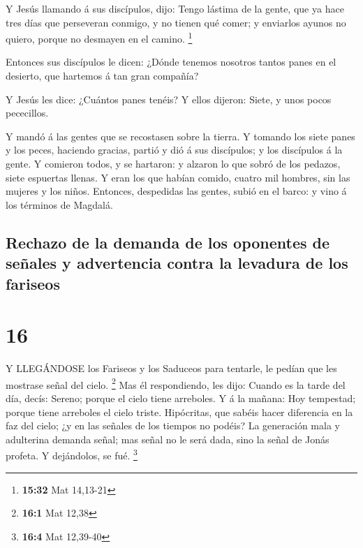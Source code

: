  Y Jesús llamando á sus discípulos, dijo: Tengo lástima de
la gente, que ya hace tres días que perseveran conmigo, y no tienen qué
comer; y enviarlos ayunos no quiero, porque no desmayen en el camino.
\footnote{\textbf{15:32} Mat 14,13-21}

 Entonces sus discípulos le dicen: ¿Dónde tenemos nosotros
tantos panes en el desierto, que hartemos á tan gran compañía?

 Y Jesús les dice: ¿Cuántos panes tenéis? Y ellos dijeron:
Siete, y unos pocos pececillos.

 Y mandó á las gentes que se recostasen sobre la tierra.
 Y tomando los siete panes y los peces, haciendo gracias,
partió y dió á sus discípulos; y los discípulos á la gente.
 Y comieron todos, y se hartaron: y alzaron lo que sobró de
los pedazos, siete espuertas llenas.  Y eran los que habían
comido, cuatro mil hombres, sin las mujeres y los niños. 
Entonces, despedidas las gentes, subió en el barco: y vino á los
términos de Magdalá.

\hypertarget{rechazo-de-la-demanda-de-los-oponentes-de-seuxf1ales-y-advertencia-contra-la-levadura-de-los-fariseos}{%
\subsection{Rechazo de la demanda de los oponentes de señales y
advertencia contra la levadura de los
fariseos}\label{rechazo-de-la-demanda-de-los-oponentes-de-seuxf1ales-y-advertencia-contra-la-levadura-de-los-fariseos}}

\hypertarget{section-15}{%
\section{16}\label{section-15}}

 Y LLEGÁNDOSE los Fariseos y los Saduceos para tentarle, le
pedían que les mostrase señal del cielo. \footnote{\textbf{16:1} Mat
  12,38}  Mas él respondiendo, les dijo: Cuando es la tarde
del día, decís: Sereno; porque el cielo tiene arreboles.  Y
á la mañana: Hoy tempestad; porque tiene arreboles el cielo triste.
Hipócritas, que sabéis hacer diferencia en la faz del cielo; ¿y en las
señales de los tiempos no podéis?  La generación mala y
adulterina demanda señal; mas señal no le será dada, sino la señal de
Jonás profeta. Y dejándolos, se fué. \footnote{\textbf{16:4} Mat
  12,39-40}

